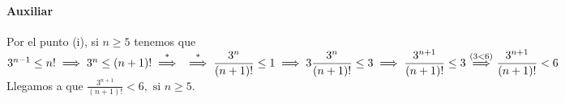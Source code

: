 \begin{enumerate}[label=\roman*)]
  \paragraph{Auxiliar}{Por el punto (i), si $n \geq 5$ tenemos que $3^{n-1} \leq n! \implies 3^{n} \leq 
  (n+1)! \overset{\text{*}}{\implies} \\
  \overset{\text{*}}{\implies} \displaystyle \frac{3^n}{(n+1)!} \leq 1 \implies 3\frac{3^n}{(n+1)!} \leq 3 \implies
  \frac{3^{n+1}}{(n+1)!} \leq 3 \overset{(3 < 6)}{\implies} \frac{3^{n+1}}{(n+1)!} < 6 $\\
  Llegamos a que $\displaystyle \frac{3^{n+1}}{(n+1)!} < 6, \text{ si } n \geq 5$.}
\end{enumerate}

